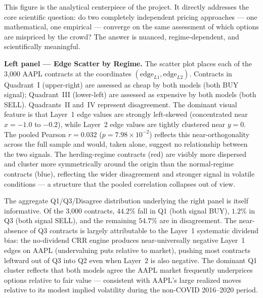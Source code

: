 \documentclass[12pt, letterpaper]{article}
\begin{document}
This figure is the analytical centerpiece of the project. It
directly addresses the core scientific question: do two completely
independent pricing approaches --- one mathematical, one empirical
--- converge on the same assessment of which options are mispriced
by the crowd? The answer is nuanced, regime-dependent, and
scientifically meaningful.

\textbf{Left panel --- Edge Scatter by Regime.} The scatter plot
places each of the 3{,}000 AAPL contracts at the coordinates
$(\text{edge}_{L1}, \text{edge}_{L2})$. Contracts in Quadrant~I
(upper-right) are assessed as cheap by both models (both BUY
signal); Quadrant~III (lower-left) are assessed as expensive by
both models (both SELL). Quadrants~II and~IV represent disagreement.
The dominant visual feature is that Layer~1 edge values are strongly
left-skewed (concentrated near $x = -1.0$ to $-0.2$), while
Layer~2 edge values are tightly clustered near $y = 0$. The pooled
Pearson $r = 0.032$ ($p = 7.98 \times 10^{-2}$) reflects this
near-orthogonality across the full sample and would, taken alone,
suggest no relationship between the two signals. The herding-regime
contracts (red) are visibly more dispersed and cluster more
symmetrically around the origin than the normal-regime contracts
(blue), reflecting the wider disagreement and stronger signal in
volatile conditions --- a structure that the pooled correlation
collapses out of view.

The aggregate Q1/Q3/Disagree distribution underlying the right panel
is itself informative. Of the 3{,}000 contracts, $44.2\%$ fall in
Q1 (both signal BUY), $1.2\%$ in Q3 (both signal SELL), and the
remaining $54.7\%$ are in disagreement. The near-absence of Q3
contracts is largely attributable to the Layer~1 systematic dividend
bias: the no-dividend CRR engine produces near-universally negative
Layer~1 edges on AAPL (undervaluing puts relative to market), pushing
most contracts leftward out of Q3 into Q2 even when Layer~2 is also
negative. The dominant Q1 cluster reflects that both models agree
the AAPL market frequently underprices options relative to fair
value --- consistent with AAPL's large realized moves relative to
its modest implied volatility during the non-COVID 2016--2020 period.
\end{document}
